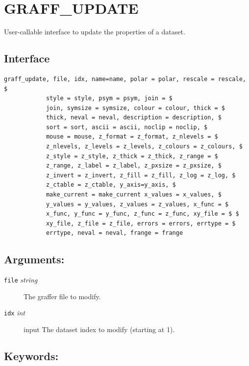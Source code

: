 \documentclass[11pt,twoside,english]{article}
\begin{document}
\section{GRAFF\_UPDATE}
\label{sec:graff_update}

User-callable interface to update the properties of a dataset.

\subsection{Interface}
\label{sec:upd_interface}


\begin{verbatim}
graff_update, file, idx, name=name, polar = polar, rescale = rescale, $
            style = style, psym = psym, join = $
            join, symsize = symsize, colour = colour, thick = $
            thick, neval = neval, description = description, $
            sort = sort, ascii = ascii, noclip = noclip, $
            mouse = mouse, z_format = z_format, z_nlevels = $
            z_nlevels, z_levels = z_levels, z_colours = z_colours, $
            z_style = z_style, z_thick = z_thick, z_range = $
            z_range, z_label = z_label, z_pxsize = z_pxsize, $
            z_invert = z_invert, z_fill = z_fill, z_log = z_log, $
            z_ctable = z_ctable, y_axis=y_axis, $
            make_current = make_current x_values = x_values, $
            y_values = y_values, z_values = z_values, x_func = $
            x_func, y_func = y_func, z_func = z_func, xy_file = $ $
            xy_file, z_file = z_file, errors = errors, errtype = $
            errtype, neval = neval, frange = frange
\end{verbatim}

\subsection{Arguments:}
\label{sec:gu_args}


\begin{description}
\item[\texttt{file} \textit{string}] The graffer file to modify.
\item[\texttt{idx} \textit{int}] input The dataset index to modify
  (starting at 1).
\end{description}

\subsection{Keywords:}
\label{sec:gu-keywords}
\end{document}
